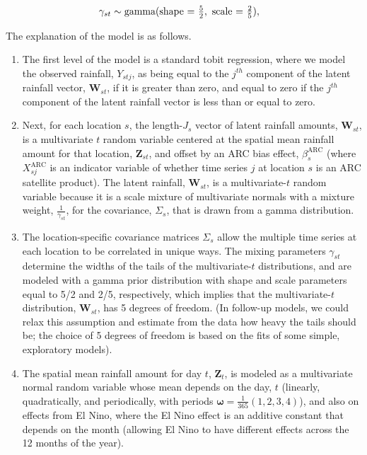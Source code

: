 \documentclass[12pt]{article}
\def\bomega{\pmb{\omega}}
\def\bZ{\pmb{Z}}
\def\bW{\pmb{W}}
\begin{document}
$\hspace{1.3in}
\gamma_{st} \sim \text{gamma}(\text{shape = } \frac{5}{2}, \text{ scale = } \frac{2}{5}),
$



The explanation of the model is as follows.
\begin{enumerate}
\item The first level of the model is a standard tobit regression, where we model the observed rainfall, $Y_{stj}$, as being equal to the $j^{th}$ component of the latent rainfall vector, $\bW_{st}$, if it is greater than zero, and equal to zero if the $j^{th}$ component of the latent rainfall vector is less than or equal to zero.
\item Next, for each location $s$, the length-$J_s$ vector of latent rainfall amounts, $\bW_{st}$, is a multivariate $t$ random variable centered at the spatial mean rainfall amount for that location, $\bZ_{st}$, and offset by an ARC bias effect, $\beta_s^\text{ARC}$ (where $X^\text{ARC}_{sj}$ is an indicator variable of whether time series $j$ at location $s$ is an ARC satellite product). The latent rainfall, $\bW_{st}$, is a multivariate-$t$ random variable because it is a scale mixture of multivariate normals with a mixture weight, $\frac{1}{\gamma_{st}}$, for the covariance, $\Sigma_s$, that is drawn from a gamma distribution.
\item The location-specific covariance matrices $\Sigma_s$ allow the multiple time series at each location to be correlated in unique ways. The mixing parameters $\gamma_{st}$ determine the widths of the tails of the multivariate-$t$ distributions, and are modeled with a gamma prior distribution with shape and scale parameters equal to 5/2 and 2/5, respectively, which implies that the multivariate-$t$ distribution, $\bW_{st}$, has 5 degrees of freedom. (In follow-up models, we could relax this assumption and estimate from the data how heavy the tails should be; the choice of 5 degrees of freedom is based on the fits of some simple, exploratory models).
\item The spatial mean rainfall amount for day $t$, $\bZ_t$, is modeled as a multivariate normal random variable whose mean depends on the day, $t$ (linearly, quadratically, and periodically, with periods $\bomega = \frac{1}{365}(1, 2, 3, 4)$), and also on effects from El Nino, where the El Nino effect is an additive constant that depends on the month (allowing El Nino to have different effects across the 12 months of the year).

\end{enumerate}
\end{document}

